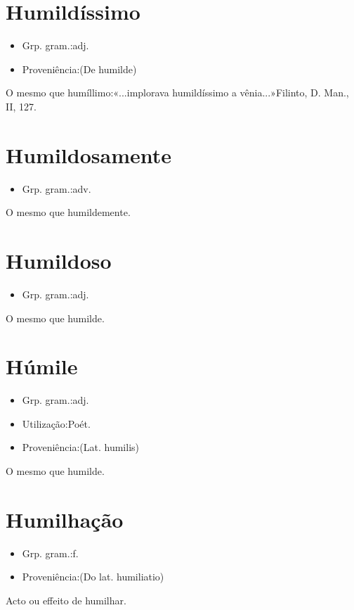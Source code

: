 \documentclass{article}
\begin{document}
\section{Humildíssimo}
\begin{itemize}
\item {Grp. gram.:adj.}
\end{itemize}
\begin{itemize}
\item {Proveniência:(De \textunderscore humilde\textunderscore )}
\end{itemize}
O mesmo que \textunderscore humíllimo\textunderscore :«\textunderscore ...implorava humildíssimo a vênia...\textunderscore »Filinto, \textunderscore D. Man.\textunderscore , II, 127.
\section{Humildosamente}
\begin{itemize}
\item {Grp. gram.:adv.}
\end{itemize}
O mesmo que \textunderscore humildemente\textunderscore .
\section{Humildoso}
\begin{itemize}
\item {Grp. gram.:adj.}
\end{itemize}
O mesmo que \textunderscore humilde\textunderscore .
\section{Húmile}
\begin{itemize}
\item {Grp. gram.:adj.}
\end{itemize}
\begin{itemize}
\item {Utilização:Poét.}
\end{itemize}
\begin{itemize}
\item {Proveniência:(Lat. \textunderscore humilis\textunderscore )}
\end{itemize}
O mesmo que \textunderscore humilde\textunderscore .
\section{Humilhação}
\begin{itemize}
\item {Grp. gram.:f.}
\end{itemize}
\begin{itemize}
\item {Proveniência:(Do lat. \textunderscore humiliatio\textunderscore )}
\end{itemize}
Acto ou effeito de humilhar.
\end{document}
